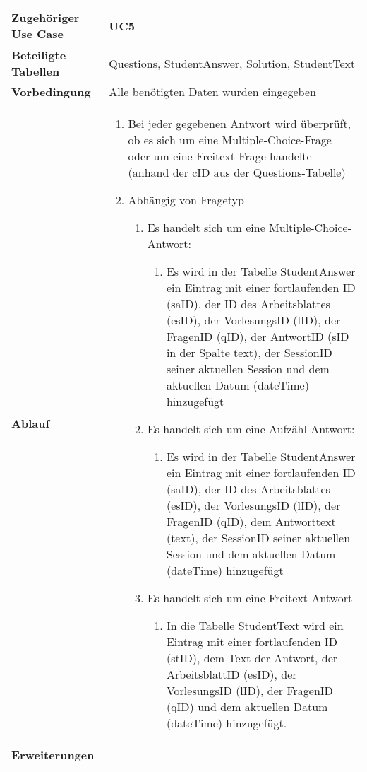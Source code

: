 \begin{table}[h]
	\begin{tabular}{|p{3cm}|p{11.06cm}|}
	\hline
		\textbf{Zugehöriger Use Case}                 &     UC5    \\ \hline
		\textbf{Beteiligte Tabellen}      &     Questions, StudentAnswer, Solution, StudentText    \\ \hline
		\textbf{Vorbedingung}              &    Alle benötigten Daten wurden eingegeben     \\ \hline
		\textbf{Ablauf}              &   
			\begin{enumerate}
			  \item Bei jeder gegebenen Antwort wird überprüft, ob es sich um eine Multiple-Choice-Frage oder um eine Freitext-Frage handelte (anhand der cID aus der Questions-Tabelle)
			  \item Abhängig von Fragetyp
			  \begin{enumerate}
			    \item Es handelt sich um eine Multiple-Choice-Antwort:
			    	\begin{enumerate}
					    \item Es wird in der Tabelle StudentAnswer ein Eintrag mit einer fortlaufenden ID (saID), der ID des Arbeitsblattes (esID), der VorlesungsID (lID), der FragenID (qID), der AntwortID (sID in der Spalte text), der SessionID seiner aktuellen Session und dem aktuellen Datum (dateTime) hinzugefügt
			  		\end{enumerate}
			  	\item Es handelt sich um eine Aufzähl-Antwort:
			    	\begin{enumerate}
					    \item Es wird in der Tabelle StudentAnswer ein Eintrag mit einer fortlaufenden ID (saID), der ID des Arbeitsblattes (esID), der VorlesungsID (lID), der FragenID (qID), dem Antworttext (text), der SessionID seiner aktuellen Session und dem aktuellen Datum (dateTime) hinzugefügt
			  		\end{enumerate}
			    \item Es handelt sich um eine Freitext-Antwort
				    \begin{enumerate}
					    \item In die Tabelle StudentText wird ein Eintrag mit einer fortlaufenden ID (stID), dem Text der Antwort, der ArbeitsblattID (esID), der VorlesungsID (lID), der FragenID (qID) und dem aktuellen Datum (dateTime) hinzugefügt.
				 	 \end{enumerate}
			  \end{enumerate}
			\end{enumerate}
		\\ \hline
		\textbf{Erweiterungen}              &         \\ \hline
	\end{tabular}
\end{table}\FloatBarrier


